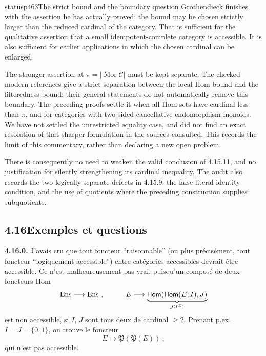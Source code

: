 \begin{dcomment}{status}{p463}{The strict bound and the boundary question}
Grothendieck finishes with the assertion he has actually proved: the bound may be chosen strictly larger than the reduced cardinal of the category. That is sufficient for the qualitative assertion that a small idempotent-complete category is accessible. It is also sufficient for earlier applications in which the chosen cardinal can be enlarged.

The stronger assertion at $\pi=|\operatorname{Mor}\mathcal C|$ must be kept separate. The checked modern references give a strict separation between the local Hom bound and the filteredness bound; their general statements do not automatically remove this boundary. The preceding proofs settle it when all Hom sets have cardinal less than $\pi$, and for categories with two-sided cancellative endomorphism monoids. We have not settled the unrestricted equality case, and did not find an exact resolution of that sharper formulation in the sources consulted. This records the limit of this commentary, rather than declaring a new open problem.

There is consequently no need to weaken the valid conclusion of 4.15.11, and no justification for silently strengthening its cardinal inequality. The audit also records the two logically separate defects in 4.15.9: the false literal identity condition, and the use of quotients where the preceding construction supplies subquotients.
\end{dcomment}


\subsection*{4.16\quad Exemples et questions}

\textbf{4.16.0.} J'avais cru que tout foncteur “raisonnable” (ou plus précisément, tout foncteur “logiquement accessible”) entre catégories accessibles devrait être accessible. Ce n'est malheureusement pas vrai, puisqu'un composé de deux foncteurs Hom
\[
\mathrm{Ens} \longrightarrow \mathrm{Ens}\ , \qquad\quad E \longmapsto \underbrace{\mathsf{Hom}(\mathsf{Hom}(E,I),J)}_{J^{(I^E)}}
\]
est non accessible, si $I$, $J$ sont tous deux de cardinal $\geqslant 2$. Prenant p.ex.\ $I = J = \{0,1\}$, on trouve le foncteur
\[
E \longmapsto \mathfrak{P}(\mathfrak{P}(E))\ ,
\]
qui n'est pas accessible.

